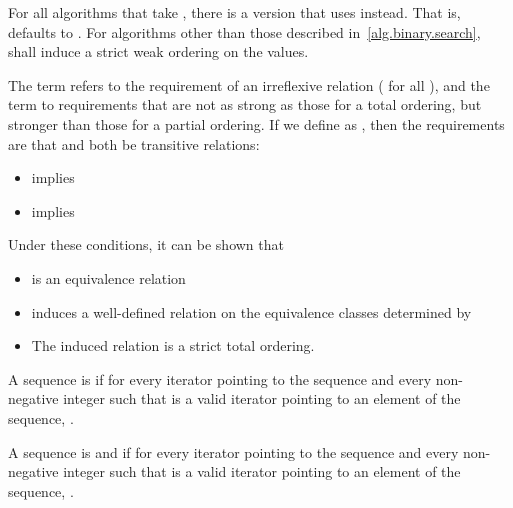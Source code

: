 \pnum
For all algorithms that take
,
there is a version that uses
instead.
That is,
defaults to
.
For algorithms other than those described in~\ref{alg.binary.search},
 shall induce a strict weak ordering on the values.


\pnum
The term
refers to the
requirement of an irreflexive relation ( for all ),
and the term
to requirements that are not as strong as
those for a total ordering,
but stronger than those for a partial
ordering.
If we define
as
,
then the requirements are that
and
both be transitive  relations:

\begin{itemize}
\item
{}
implies
\item
{}
implies
\end{itemize}
\begin{note}
Under these conditions, it can be shown that
\begin{itemize}
\item
{}
is an equivalence relation
\item
{}
induces a well-defined relation on the equivalence
classes determined by
\item
The induced relation is a strict total ordering.
\end{itemize}
\end{note}

\pnum
A sequence is
 if for every iterator
pointing to the sequence and every non-negative integer
such that
is a valid iterator pointing to an element of the sequence,
.

\begin{addedblock}
\pnum
A sequence is
 and  if for every iterator
pointing to the sequence and every non-negative integer
such that
is a valid iterator pointing to an element of the sequence,
.
\end{addedblock}

